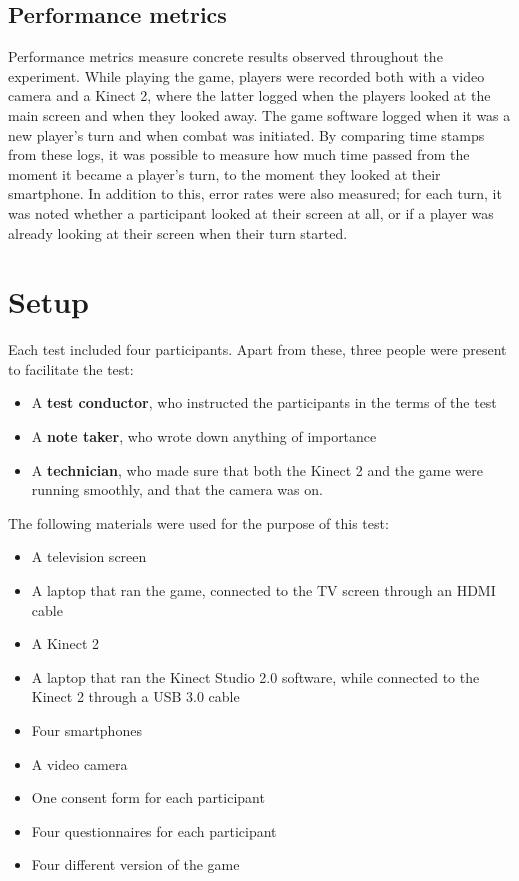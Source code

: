 \subsection{Performance metrics}\label{subsec:performance_metrics}
Performance metrics measure concrete results observed throughout the experiment. While playing the game, players were recorded both with a video camera and a Kinect 2, where the latter logged when the players looked at the main screen and when they looked away. The game software logged when it was a new player's turn and when combat was initiated. By comparing time stamps from these logs, it was possible to measure how much time passed from the moment it became a player's turn, to the moment they looked at their smartphone. In addition to this, error rates were also measured; for each turn, it was noted whether a participant looked at their screen at all, or if a player was already looking at their screen when their turn started. 

\section{Setup}
Each test included four participants. Apart from these, three people were present to facilitate the test:

\begin{itemize}
	\item A \textbf{test conductor}, who instructed the participants in the terms of the test
	\item A \textbf{note taker}, who wrote down anything of importance
	\item A \textbf{technician}, who made sure that both the Kinect 2 and the game were running smoothly, and that the camera was on.
\end{itemize}

The following materials were used for the purpose of this test:

\begin{itemize}
	\item A television screen
	\item A laptop that ran the game, connected to the TV screen through an HDMI cable
	\item A Kinect 2
	\item A laptop that ran the Kinect Studio 2.0 software, while connected to the Kinect 2 through a USB 3.0 cable
	\item Four smartphones
	\item A video camera
	\item One consent form for each participant
	\item Four questionnaires for each participant
	\item Four different version of the game
\end{itemize}

